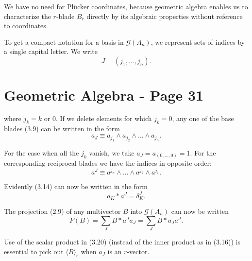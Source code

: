 \documentclass[fleqn]{scrartcl}
\numberwithin{equation}{section}
\begin{document}
\vspace{1em}
\noindent We have no need for Plücker coordinates, because geometric algebra enables us to characterize the \(r\)-blade \(B_r\) directly by its algebraic properties without reference to coordinates.

\vspace{1em}
\noindent To get a compact notation for a basis in \(\mathscr{G}(A_n)\), we represent sets of indices by a single capital letter. We write
\begin{equation}
J = (j_1, \dots, j_n). \tag{3.18a}
\end{equation}

\section*{Geometric Algebra - Page 31}

\noindent where \(j_k = k\) or \(0\). If we delete elements for which \(j_k = 0\), any one of the base blades (3.9) can be written in the form
\begin{equation}
a_J \equiv a_{j_1} \wedge a_{j_2} \wedge \dots \wedge a_{j_n}. \tag{3.18b}
\end{equation}

\noindent For the case when all the \(j_k\) vanish, we take \(a_J = a_{(0, \dots, 0)} = 1\). For the corresponding reciprocal blades we have the indices in opposite order;
\begin{equation}
a^J \equiv a^{j_n} \wedge \dots \wedge a^{j_2} \wedge a^{j_1}. \tag{3.18c}
\end{equation}

\noindent Evidently (3.14) can now be written in the form
\begin{equation}
a_K * a^J = \delta_K^J. \tag{3.19}
\end{equation}

\noindent The projection (2.9) of any multivector \(B\) into \(\mathscr{G}(A_n)\) can now be written
\begin{equation}
P(B) = \sum_J B * a^J a_J = \sum_J B * a_J a^J. \tag{3.20}
\end{equation}

\noindent Use of the scalar product in (3.20) (instead of the inner product as in (3.16)) is essential to pick out \(\langle B \rangle_r\) when \(a_J\) is an \(r\)-vector.
\end{document}
